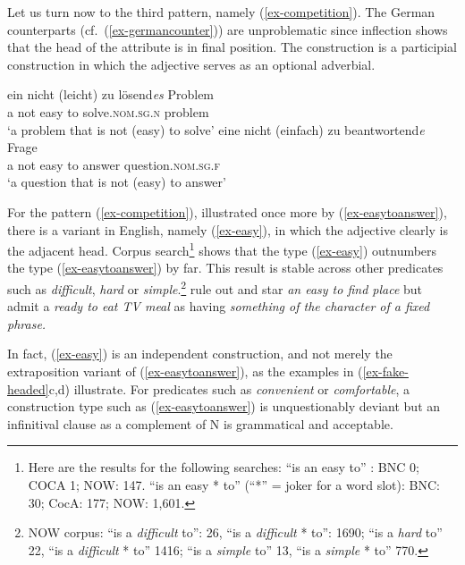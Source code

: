 \documentclass[output=paper
  ,nobabel
  ,uniformtopskip %
]{langscibook}
\begin{document}
Let us turn now to the third pattern, namely (\ref{ex-competition}). The German counterparts (cf.\ (\ref{ex-germancounter})) are unproblematic since inflection shows that the head of the attribute is in final position. The construction is a participial construction in which the adjective serves as an optional adverbial.

\eal\label{ex-germancounter}
\ex 
\gll ein nicht (leicht) zu lösend\emph{es} Problem \\
     a not \spacebr{}easy to solve.\textsc{nom.sg.n} problem \\
\glt `a problem that is not (easy) to solve'
\ex 
\gll eine nicht (einfach) zu beantwortend\emph{e} Frage \\
     a not \spacebr{}easy to answer question.\textsc{nom.sg.f}	\\
\glt `a question that is not (easy) to answer'
\zl

\largerpage[-1]
\noindent
For the pattern (\ref{ex-competition}), illustrated once more by (\ref{ex-easytoanswer}), there is a variant in English, namely (\ref{ex-easy}), in which the adjective clearly is the adjacent head. Corpus search\footnote{Here are the results for the following searches:
\ea ``is an easy to''	: 	BNC   0;  COCA  1;  NOW:  147.
\ex ``is an easy * to'' (``*'' = joker for a word slot): BNC: 30; CocA: 177; NOW: 1,601.
\z}
shows that the type (\ref{ex-easy}) outnumbers the type (\ref{ex-easytoanswer}) by far. This result is stable across other predicates such as \emph{difficult}, \emph{hard} or \emph{simple}.\footnote{NOW corpus: ``is a \emph{difficult} to'': 26, ``is a \emph{difficult} * to'': 1690; ``is a \emph{hard} to'' 22, ``is a \emph{difficult} * to'' 1416; ``is a \emph{simple} to'' 13, ``is a \emph{simple} * to'' 770.} \citet*[551]{HuddlestonPullum2002} rule out and star \emph{an easy to find place} but admit a \emph{ready to eat TV meal} as having \emph{something of the character of a fixed phrase.}

In fact, (\ref{ex-easy}) is an independent construction, and not merely the extraposition variant of
(\ref{ex-easytoanswer}), as the examples in (\ref{ex-fake-headed}c,d) illustrate. For predicates
such as \emph{convenient} or \emph{comfortable}, a construction type such as (\ref{ex-easytoanswer})
is unquestionably deviant but an infinitival clause as a complement of N is grammatical and
acceptable.

\pagebreak
\eal\label{ex-fake-headed}
\label{ex-easytoanswer}
\label{ex-easy}
\label{ex-price}
\label{ex-car}
\zl
\end{document}
